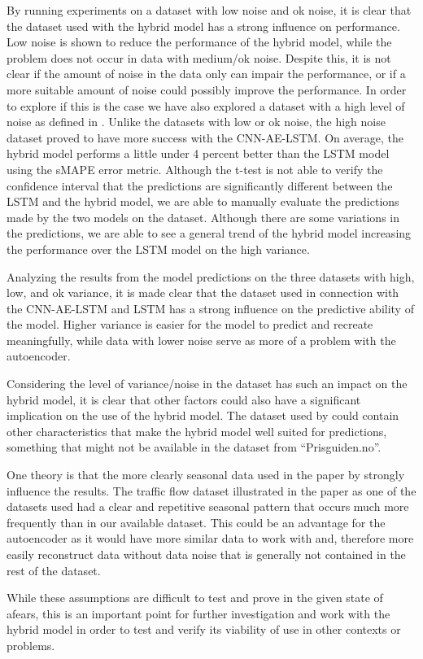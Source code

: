 By running experiments on a dataset with low noise and ok noise, it is clear that the dataset used with the hybrid model has a strong influence on performance.
Low noise is shown to reduce the performance of the hybrid model, while the problem does not occur in data with medium/ok noise.
Despite this, it is not clear if the amount of noise in the data only can impair the performance,
or if a more suitable amount of noise could possibly improve the performance.
In order to explore if this is the case we have also explored a dataset with a high level of noise as defined in .
Unlike the datasets with low or ok noise, the high noise dataset proved to have more success with the CNN-AE-LSTM.
On average, the hybrid model performs a little under 4 percent better than the LSTM model using the sMAPE error metric.
Although the t-test is not able to verify the confidence interval that the predictions are significantly different between the LSTM and the hybrid model,
we are able to manually evaluate the predictions made by the two models on the dataset.
Although there are some variations in the predictions, we are able to see a general trend of the hybrid model increasing the performance over the LSTM model on the high variance.

Analyzing the results from the model predictions on the three datasets with high, low, and ok variance,
it is made clear that the dataset used in connection with the CNN-AE-LSTM and LSTM
has a strong influence on the predictive ability of the model.
Higher variance is easier for the model to predict and recreate meaningfully,
while data with lower noise serve as more of a problem with the autoencoder.

Considering the level of variance/noise in the dataset has such an impact on the hybrid model, it
is clear that other factors could also have a significant implication on the use of the hybrid model.
The dataset used by \cite{Zhao2019} could contain other characteristics that make the hybrid model well suited for predictions,
something that might not be available in the dataset from ``Prisguiden.no''.

One theory is that the more clearly seasonal data used in the paper by \cite{Zhao2019} strongly influence the results.
The traffic flow dataset illustrated in the paper as one of the datasets used had a clear and repetitive seasonal
pattern that occurs much more frequently than in our available dataset.
This could be an advantage for the autoencoder as it would have more similar data to work with and, therefore more easily
reconstruct data without data noise that is generally not contained in the rest of the dataset.

While these assumptions are difficult to test and prove in the given state of afears,
this is an important point for further investigation and work with the hybrid model in order
to test and verify its viability of use in other contexts or problems.






